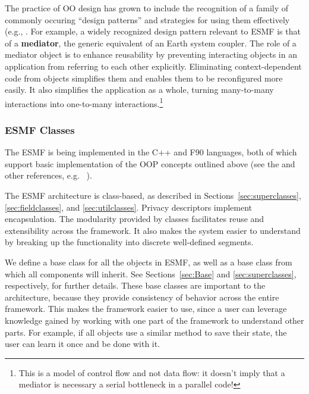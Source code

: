 The practice of OO design has grown to include the recognition of a family
of commonly occuring ``design patterns'' and strategies for using them 
effectively (e.g., \cite{alexandrescu, gamma}.  For example, a widely
recognized design pattern relevant to ESMF is that of a {\bf mediator},
the generic equivalent of an Earth system coupler.  The role of a 
mediator object is to enhance reusability by preventing interacting objects 
in an application from referring to each other explicitly.  Eliminating 
context-dependent code from objects simplifies them and enables them to be 
reconfigured more easily.   It also simplifies the application as a whole, turning 
many-to-many interactions into one-to-many interactions.\footnote{This is a 
model of control flow and not data flow:  it doesn't imply that a 
mediator is necessary a serial bottleneck in a parallel code!}  

\subsubsection{ESMF Classes}

The ESMF is being implemented in the C++ and F90 languages, both of which support 
basic implementation of the OOP concepts outlined above (see the  \cite{bib:ESMFimplrep}
and other references, e.g. ~\cite{decyk97, decyk00}).  

The ESMF architecture is class-based, as described in Sections~\ref{sec:superclasses}, 
\ref{sec:fieldclasses}, and \ref{sec:utilclasses}.  Privacy descriptors 
implement encapsulation.  The modularity provided by classes facilitates reuse
and extensibility across the framework.  It also makes the system easier to 
understand by breaking up the functionality into discrete well-defined segments.

We define a base class for all the objects in ESMF, as well as a base class 
from which all components will inherit.  See Sections~\ref{sec:Base} and 
\ref{sec:superclasses}, respectively, for further details.  These base
classes are important to the architecture, because they provide consistency
of behavior across the entire framework.  This makes the framework easier
to use, since a user can leverage knowledge gained by working with one
part of the framework to understand other parts.  For example, if all
objects use a similar method to save their state, the user can learn it 
once and be done with it.

